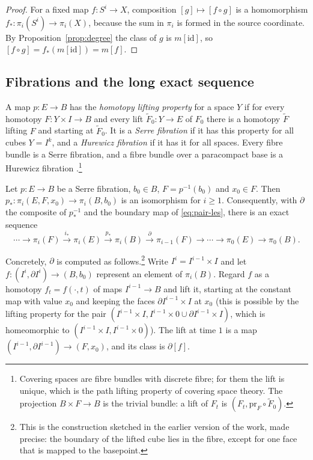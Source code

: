 \begin{proof}
For a fixed map $f\colon S^i\to X$, composition $[g]\mapsto[f\circ g]$ is a homomorphism $f_*\colon\pi_i(S^i)\to\pi_i(X)$, because the sum in $\pi_i$ is formed in the source coordinate. By Proposition~\ref{prop:degree} the class of $g$ is $m[\mathrm{id}]$, so $[f\circ g]=f_*(m[\mathrm{id}])=m[f]$.
\end{proof}

\subsection{Fibrations and the long exact sequence}

A map $p\colon E\to B$ has the \emph{homotopy lifting property} for a space $Y$ if for every homotopy $F\colon Y\times I\to B$ and every lift $\tilde F_0\colon Y\to E$ of $F_0$ there is a homotopy $\tilde F$ lifting $F$ and starting at $\tilde F_0$. It is a \emph{Serre fibration} if it has this property for all cubes $Y=I^k$, and a \emph{Hurewicz fibration} if it has it for all spaces. Every fibre bundle is a Serre fibration, and a fibre bundle over a paracompact base is a Hurewicz fibration \cite[Proposition~4.48 and the remarks after it]{Hat02}.\footnote{Covering spaces are fibre bundles with discrete fibre; for them the lift is unique, which is the path lifting property of covering space theory. The projection $B\times F\to B$ is the trivial bundle: a lift of $F_t$ is $(F_t,\mathrm{pr}_F\circ\tilde F_0)$.}

\begin{theorem}\label{thm:les}
Let $p\colon E\to B$ be a Serre fibration, $b_0\in B$, $F=p^{-1}(b_0)$ and $x_0\in F$. Then $p_*\colon\pi_i(E,F,x_0)\to\pi_i(B,b_0)$ is an isomorphism for $i\ge1$. Consequently, with $\partial$ the composite of $p_*^{-1}$ and the boundary map of \eqref{eq:pair-les}, there is an exact sequence
\[
\cdots\to\pi_i(F)\xrightarrow{\ i_*\ }\pi_i(E)\xrightarrow{\ p_*\ }\pi_i(B)\xrightarrow{\ \partial\ }\pi_{i-1}(F)\to\cdots\to\pi_0(E)\to\pi_0(B).
\]
\end{theorem}

Concretely, $\partial$ is computed as follows.\footnote{This is the construction sketched in the earlier version of the work, made precise: the boundary of the lifted cube lies in the fibre, except for one face that is mapped to the basepoint.} Write $I^i=I^{i-1}\times I$ and let $f\colon(I^i,\partial I^i)\to(B,b_0)$ represent an element of $\pi_i(B)$. Regard $f$ as a homotopy $f_t=f(\cdot,t)$ of maps $I^{i-1}\to B$ and lift it, starting at the constant map with value $x_0$ and keeping the faces $\partial I^{i-1}\times I$ at $x_0$ (this is possible by the lifting property for the pair $(I^{i-1}\times I, I^{i-1}\times0\cup\partial I^{i-1}\times I)$, which is homeomorphic to $(I^{i-1}\times I,I^{i-1}\times0)$). The lift at time $1$ is a map $(I^{i-1},\partial I^{i-1})\to(F,x_0)$, and its class is $\partial[f]$.

